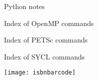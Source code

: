 \documentclass[11pt,letterpaper,twoside,openany]{boek3}
\begin{document}
 {Python notes}

\begin{multicols*}{2}
  \printindex[python]
\end{multicols*}

 {Index of OpenMP commands}

\begin{multicols*}{2}
\printindex[omp]
\end{multicols*}

 {Index of PETSc commands}

\begin{multicols*}{2}
\printindex[petsc]
\end{multicols*}

 {Index of SYCL commands}

\begin{multicols*}{2}
\printindex[sycl]
\end{multicols*}

\hbox{}\vfill
\texttt{[image: isbnbarcode]}

\closeout\chapterlist
\end{document}
